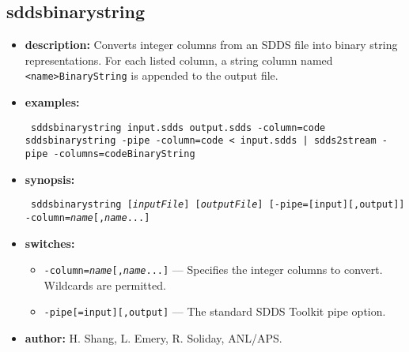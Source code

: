 \newpage
\subsection{sddsbinarystring}
\label{sddsbinarystring}

\begin{itemize}
  \item {\bf description:}
  Converts integer columns from an SDDS file into binary string representations.
  For each listed column, a string column named \verb|<name>BinaryString| is appended
  to the output file.

  \item {\bf examples:}
  \begin{flushleft}{\tt
  sddsbinarystring input.sdds output.sdds -column=code\\
  sddsbinarystring -pipe -column=code < input.sdds | sdds2stream -pipe -columns=codeBinaryString
  }\end{flushleft}

  \item {\bf synopsis:}
  \begin{flushleft}{\tt
  sddsbinarystring [{\em inputFile}] [{\em outputFile}] [-pipe=[input][,output]]\\
  -column={\em name}[,{\em name}...]
  }\end{flushleft}

  \item {\bf switches:}
  \begin{itemize}
    \item {\tt -column={\em name}[,{\em name}...]} --- Specifies the integer columns to convert. Wildcards are permitted.
    \item {\tt -pipe[=input][,output]} --- The standard SDDS Toolkit pipe option.
  \end{itemize}

  \item {\bf author:} H. Shang, L. Emery, R. Soliday, ANL/APS.
\end{itemize}
